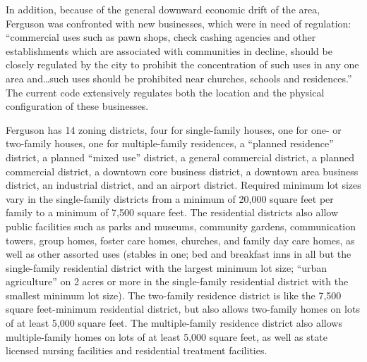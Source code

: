 In addition, because of the general downward economic drift of the area,
Ferguson was confronted with new businesses, which were in need of regulation:
``commercial uses such as pawn shops, check cashing agencies and other
establishments which are associated with communities in decline, should be
closely regulated by the city to prohibit the concentration of such uses in any
one area and\ldots such uses should be prohibited near churches, schools and
residences.'' The current code extensively regulates both the location and the
physical configuration of these businesses.


Ferguson has 14 zoning districts, four for single-family houses, one for one- or
two-family houses, one for multiple-family residences, a ``planned residence''
district, a planned ``mixed use'' district, a general commercial district, a
planned commercial district, a downtown core business district, a downtown area
business district, an industrial district, and an airport district. Required
minimum lot sizes vary in the single-family districts from a minimum of 20,000
square feet per family to a minimum of 7,500 square feet. The residential
districts also allow public facilities such as parks and museums, community
gardens, communication towers, group homes, foster care homes, churches, and
family day care homes, as well as other assorted uses (stables in one; bed and
breakfast inns in all but the single-family residential district with the
largest minimum lot size; ``urban agriculture'' on 2 acres or more in the
single-family residential district with the smallest minimum lot size). The
two-family residence district is like the 7,500 square feet-minimum residential
district, but also allows two-family homes on lots of at least 5,000 square
feet. The multiple-family residence district also allows multiple-family homes
on lots of at least 5,000 square feet, as well as state licensed nursing
facilities and residential treatment facilities.

